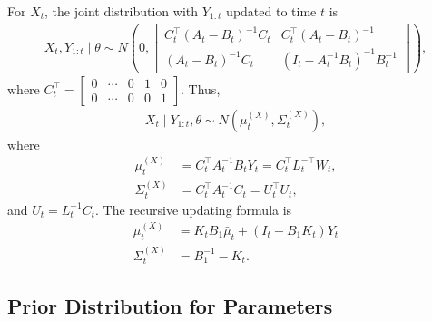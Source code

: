 For $X_{t}$, the joint distribution with $Y_{1:t}$ updated to time $t$ is 
\begin{align*}
X_{t}, Y_{1:t} \mid \theta \sim N\left( 0, \begin{bmatrix}
C_{t}^\top\left(A_{t}-B_{t}\right) ^{-1}C_{t} & C_{t}^\top \left(A_{t}-B_{t}\right)^{-1}\\
\left(A_{t}-B_{t}\right)^{-1}C_{t} & \left(I_t- A_{t}^{-1}B_{t}\right) ^{-1}B_{t}^{-1}
\end{bmatrix} \right),
\end{align*}
where $C_{t}^\top=\begin{bmatrix}
0 & \cdots & 0 & 1 & 0 \\ 0 & \cdots & 0 & 0 & 1 
\end{bmatrix}$. Thus,
\begin{align*}
X_{t}\mid Y_{1:t},\theta \sim N\left(\mu_{t}^{\left(X\right)},\Sigma_{t}^{\left(X\right)}\right),
\end{align*}
where
\begin{align*}
\mu_{t}^{\left(X\right)} & = C_{t}^\top A_t^{-1}B_tY_t =C_{t}^\top L_t^{-\top}W_t,\\
\Sigma_{t}^{\left(X\right)} & =C_{t}^\top A_t^{-1}C_{t} =U_{t}^\top U_{t},
\end{align*}
and $U_{t} = L_t^{-1} C_{t}$.
The recursive updating formula is  
\begin{align}
\mu_{t}^{\left(X\right)}  &=  K_{t}B_1\bar{\mu}_{t} + \left(I_t- B_1K_{t}\right)Y_{t}  \\
\Sigma_{t}^{\left(X\right)}  &=B_1^{-1}-K_{t}.
\end{align}





\subsection{Prior Distribution for Parameters}

